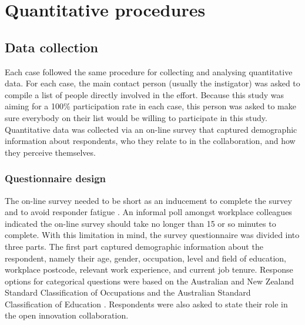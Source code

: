 \section{Quantitative procedures}



\subsection{Data collection}

Each case followed the same procedure for collecting and analysing quantitative data. For each case, the main contact person (usually the instigator) was asked to compile a list of people directly involved in the effort. Because this study was aiming for a 100\% participation rate in each case, this person was asked to make sure everybody on their list would be willing to participate in this study. Quantitative data was collected via an on-line survey that captured demographic information about respondents, who they relate to in the collaboration, and how they perceive themselves.\medskip

\subsubsection{Questionnaire design}

The on-line survey needed to be short as an inducement to complete the survey and to avoid responder fatigue \citep{crawford2001web,van2006conducting}. An informal poll amongst workplace colleagues indicated the on-line survey should take no longer than 15 or so minutes to complete. With this limitation in mind, the survey questionnaire was divided into three parts. The first part captured demographic information about the respondent, namely their age, gender, occupation, level and field of education, workplace postcode, relevant work experience, and current job tenure. Response options for categorical questions were based on the Australian and New Zealand Standard Classification of Occupations \citep{pink2009anzsco} and the Australian Standard Classification of Education \citep{trewin2000australian}. Respondents were also asked to state their role in the open innovation collaboration.\medskip

